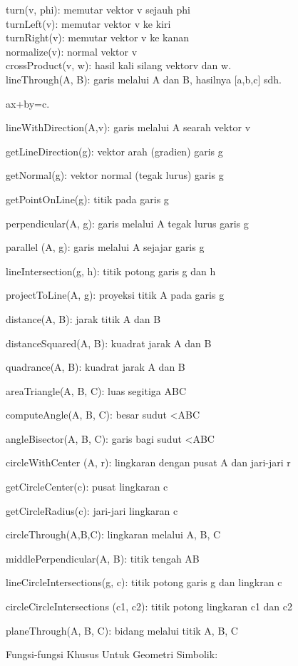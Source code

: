 \documentclass[
]{book}
\begin{document}
turn(v, phi): memutar vektor v sejauh phi\\
turnLeft(v): memutar vektor v ke kiri\\
turnRight(v): memutar vektor v ke kanan\\
normalize(v): normal vektor v\\
crossProduct(v, w): hasil kali silang vektorv dan w.\\
lineThrough(A, B): garis melalui A dan B, hasilnya {[}a,b,c{]} sdh.

ax+by=c.

lineWithDirection(A,v): garis melalui A searah vektor v

getLineDirection(g): vektor arah (gradien) garis g

getNormal(g): vektor normal (tegak lurus) garis g

getPointOnLine(g): titik pada garis g

perpendicular(A, g): garis melalui A tegak lurus garis g

parallel (A, g): garis melalui A sejajar garis g

lineIntersection(g, h): titik potong garis g dan h

projectToLine(A, g): proyeksi titik A pada garis g

distance(A, B): jarak titik A dan B

distanceSquared(A, B): kuadrat jarak A dan B

quadrance(A, B): kuadrat jarak A dan B

areaTriangle(A, B, C): luas segitiga ABC

computeAngle(A, B, C): besar sudut \textless ABC

angleBisector(A, B, C): garis bagi sudut \textless ABC

circleWithCenter (A, r): lingkaran dengan pusat A dan jari-jari r

getCircleCenter(c): pusat lingkaran c

getCircleRadius(c): jari-jari lingkaran c

circleThrough(A,B,C): lingkaran melalui A, B, C

middlePerpendicular(A, B): titik tengah AB

lineCircleIntersections(g, c): titik potong garis g dan lingkran c

circleCircleIntersections (c1, c2): titik potong lingkaran c1 dan c2

planeThrough(A, B, C): bidang melalui titik A, B, C

Fungsi-fungsi Khusus Untuk Geometri Simbolik:
\end{document}
